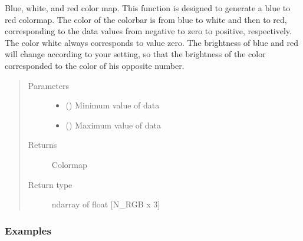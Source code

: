 \documentclass[letterpaper,10pt,english,openany,oneside]{sphinxmanual}
\begin{document}
\begin{fulllineitems}
\label{\detokenize{pygpc:pygpc.Visualization.b2rcw}}
Blue, white, and red color map.
This function is designed to generate a blue to red colormap. The color of the colorbar is from blue to white and
then to red, corresponding to the data values from negative to zero to positive, respectively.
The color white always corresponds to value zero. The brightness of blue and red will change according to your
setting, so that the brightness of the color corresponded to the color of his opposite number.
\begin{quote}\begin{description}
\item[{Parameters}] \leavevmode\begin{itemize}
\item {} 
 () \textendash{} Minimum value of data

\item {} 
 () \textendash{} Maximum value of data

\end{itemize}

\item[{Returns}] \leavevmode
{} \textendash{} Colormap

\item[{Return type}] \leavevmode
ndarray of float {[}N\_RGB x 3{]}

\end{description}\end{quote}
\subsubsection*{Examples}

%
\begin{sphinxVerbatim}[commandchars=\\\{\}]
    
    
\end{sphinxVerbatim}

\end{fulllineitems}
\end{document}
